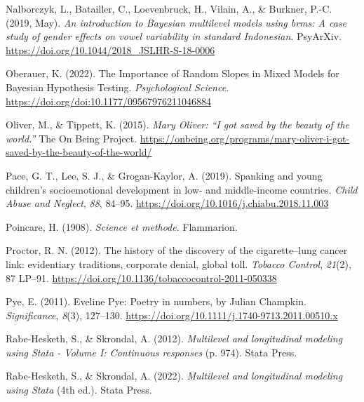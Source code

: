 \documentclass[
  letterpaper,
  DIV=11,
  numbers=noendperiod]{scrreprt}
\newlength{\cslhangindent}
\newlength{\cslentryspacingunit} %
\newenvironment{CSLReferences}[2] %
 {%
  \setlength{\parindent}{0pt}
  \ifodd #1
  \let\oldpar\par
  \def\par{\hangindent=\cslhangindent\oldpar}
  \fi
  \setlength{\parskip}{#2\cslentryspacingunit}
 }%
 {}
\begin{document}
\begin{CSLReferences}{1}{0}
\leavevmode{}%
Nalborczyk, L., Batailler, C., Loevenbruck, H., Vilain, A., \& Burkner,
P.-C. (2019, May). \emph{An introduction to {B}ayesian multilevel models
using brms: A case study of gender effects on vowel variability in
standard {I}ndonesian}. PsyArXiv.
\url{https://doi.org/10.1044/2018_JSLHR-S-18-0006}

\leavevmode{}%
Oberauer, K. (2022). {The Importance of Random Slopes in Mixed Models
for Bayesian Hypothesis Testing}. \emph{Psychological Science}.
\url{https://doi.org/doi:10.1177/09567976211046884}

\leavevmode{}%
Oliver, M., \& Tippett, K. (2015). \emph{{M}ary {O}liver: {``{I} got
saved by the beauty of the world.''}} The On Being Project.
\url{https://onbeing.org/programs/mary-oliver-i-got-saved-by-the-beauty-of-the-world/}

\leavevmode{}%
Pace, G. T., Lee, S. J., \& Grogan-Kaylor, A. (2019). {Spanking and
young children's socioemotional development in low- and middle-income
countries}. \emph{Child Abuse and Neglect}, \emph{88}, 84--95.
\url{https://doi.org/10.1016/j.chiabu.2018.11.003}

\leavevmode{}%
Poincare, H. (1908). \emph{Science et methode}. Flammarion.

\leavevmode{}%
Proctor, R. N. (2012). {The history of the discovery of the
cigarette--lung cancer link: evidentiary traditions, corporate denial,
global toll}. \emph{Tobacco Control}, \emph{21}(2), 87 LP--91.
\url{https://doi.org/10.1136/tobaccocontrol-2011-050338}

\leavevmode{}%
Pye, E. (2011). {E}veline {P}ye: Poetry in numbers, by {J}ulian
{C}hampkin. \emph{Significance}, \emph{8}(3), 127--130.
\url{https://doi.org/10.1111/j.1740-9713.2011.00510.x}

\leavevmode{}%
Rabe-Hesketh, S., \& Skrondal, A. (2012). \emph{Multilevel and
longitudinal modeling using {S}tata - {V}olume {I}: Continuous
responses} (p. 974). Stata Press.

\leavevmode{}%
Rabe-Hesketh, S., \& Skrondal, A. (2022). \emph{Multilevel and
longitudinal modeling using {S}tata} (4th ed.). Stata Press.


\end{CSLReferences}
\end{document}
